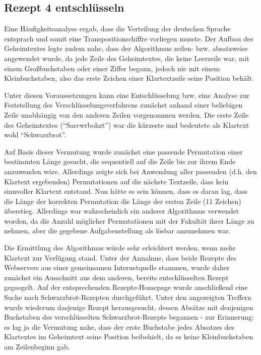 \subsection{Rezept 4 entschlüsseln}
\label{RezeptVierEntschluesseln}

Eine Häufigkeitsanalyse ergab, dass die Verteilung der deutschen Sprache
entsprach und somit eine Transpositionschiffre vorliegen musste. Der Aufbau des
Geheimtextes legte zudem nahe, dass der Algorithmus zeilen- bzw. absatzweise
angewendet wurde, da jede Zeile des Geheimtextes, die keine Leerzeile war, mit
einem Großbuchstaben oder einer Ziffer begann, jedoch nie mit einem
Kleinbuchstaben, also das erste Zeichen einer Klartextzeile seine Position
behält.

Unter diesen Voraussetzungen kann eine Entschlüsselung bzw. eine Analyse zur
Feststellung des Verschlüsselungsverfahrens zunächst anhand einer beliebigen
Zeile unabhängig von den anderen Zeilen vorgenommen werden. Die erste Zeile des
Geheimtextes (``Sarcwrbohzt'') war die kürzeste und bedeutete als Klartext wohl
``Schwarzbrot''.

Auf Basis dieser Vermutung wurde zunächst eine passende Permutation einer
bestimmten Länge gesucht, die sequentiell auf die Zeile bis zur ihrem Ende
anzuwenden wäre. Allerdings zeigte sich bei Anwendung aller passenden (d.h. den
Klartext ergebenden) Permutationen auf die nächste Textzeile, dass kein
sinnvoller Klartext entstand. Nun hätte es sein können, dass es daran lag, dass
die Länge der korrekten Permutation die Länge der ersten Zeile (11 Zeichen)
überstieg. Allerdings war wahrscheinlich ein anderer Algorithmus verwendet
worden, da die Anzahl möglicher Permutationen mit der Fakultät ihrer Länge
zu nehmen, aber die gegebene Aufgabenstellung als lösbar anzunehmen war.

Die Ermittlung des Algorithmus würde sehr erleichtert werden, wenn mehr Klartext
zur Verfügung stand. Unter der Annahme, dass beide Rezepte des Webservers aus
einer gemeinsamen Internetquelle stammen, wurde daher zunächst ein Ausschnitt
aus dem anderen, bereits entschlüsselten Rezept gegoogelt. Auf der
entsprechenden Rezepte-Homepage wurde anschließend eine Suche nach
Schwarzbrot-Rezepten durchgeführt. Unter den angezeigten Treffern wurde wiederum
dasjenige Rezept herausgesucht, dessen Absätze mit denjenigen Buchstaben des
verschlüsselten Schwarzbrot-Rezepts begannen - zur Erinnerung: es lag ja die
Vermutung nahe, dass der erste Buchstabe jedes Absatzes des Klartextes im
Geheimtext seine Position beibehielt, da es keine Kleinbuchstaben am
Zeilenbeginn gab.

